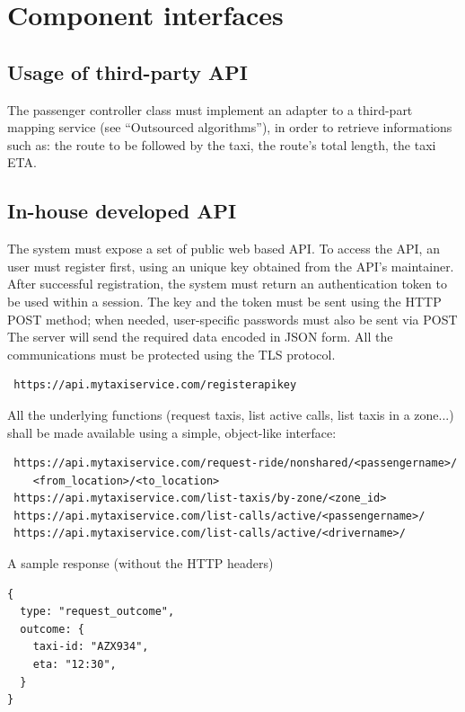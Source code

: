 \section{Component interfaces}

\subsection{Usage of third-party API}
The passenger controller class must implement an adapter to a third-part mapping service (see ``Outsourced algorithms''), in order
to retrieve informations such as: the route to be followed by the taxi, the route's total length, the taxi ETA. 

\subsection{In-house developed API}
The system must expose a set of public web based API. To access the API, an user must register first, using an unique key
obtained from the API's maintainer.
After successful registration, the system must return an authentication token to be used within a session.
The key and the token must be sent using the HTTP POST method; when needed, user-specific passwords must also
be sent via POST
The server will send the required data encoded in JSON form.
All the communications must be protected using the TLS protocol.
\begin{verbatim}
 https://api.mytaxiservice.com/registerapikey
\end{verbatim}
All the underlying functions (request taxis, list active calls, list taxis in a zone...) shall be made available using a simple,
object-like interface:
\begin{verbatim}
 https://api.mytaxiservice.com/request-ride/nonshared/<passengername>/
    <from_location>/<to_location>
 https://api.mytaxiservice.com/list-taxis/by-zone/<zone_id>
 https://api.mytaxiservice.com/list-calls/active/<passengername>/
 https://api.mytaxiservice.com/list-calls/active/<drivername>/
\end{verbatim}
A sample response (without the HTTP headers)
\begin{verbatim}
{
  type: "request_outcome",
  outcome: {
    taxi-id: "AZX934",
    eta: "12:30",
  }
}
\end{verbatim}

